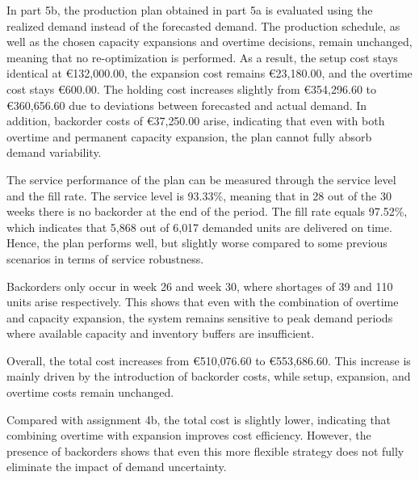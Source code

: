 \documentclass[a4paper,faculty=eb,language=en,doctype=article,sftitles=false]{ugent-doc}
\begin{document}
In part 5b, the production plan obtained in part 5a is evaluated using the realized demand instead of the forecasted demand. The production schedule, as well as the chosen capacity expansions and overtime decisions, remain unchanged, meaning that no re-optimization is performed. As a result, the setup cost stays identical at €132{,}000.00, the expansion cost remains €23{,}180.00, and the overtime cost stays €600.00. The holding cost increases slightly from €354{,}296.60 to €360{,}656.60 due to deviations between forecasted and actual demand. In addition, backorder costs of €37{,}250.00 arise, indicating that even with both overtime and permanent capacity expansion, the plan cannot fully absorb demand variability.

The service performance of the plan can be measured through the service level and the fill rate. The service level is 93.33\%, meaning that in 28 out of the 30 weeks there is no backorder at the end of the period. The fill rate equals 97.52\%, which indicates that 5{,}868 out of 6{,}017 demanded units are delivered on time. Hence, the plan performs well, but slightly worse compared to some previous scenarios in terms of service robustness.

Backorders only occur in week 26 and week 30, where shortages of 39 and 110 units arise respectively. This shows that even with the combination of overtime and capacity expansion, the system remains sensitive to peak demand periods where available capacity and inventory buffers are insufficient.

Overall, the total cost increases from €510{,}076.60 to €553{,}686.60. This increase is mainly driven by the introduction of backorder costs, while setup, expansion, and overtime costs remain unchanged.

Compared with assignment 4b, the total cost is slightly lower, indicating that combining overtime with expansion improves cost efficiency. However, the presence of backorders shows that even this more flexible strategy does not fully eliminate the impact of demand uncertainty.
\end{document}

